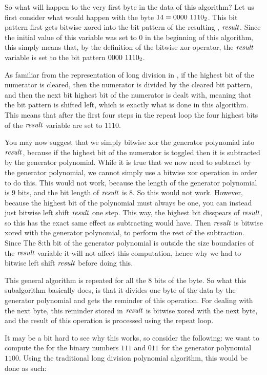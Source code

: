 So what will happen to the very first byte in the data of this
algorithm? Let us first consider what would happen with the byte $14 =
\mbox{\ensuremath{0000\ 1110_2}}$. This bit pattern first gets bitwise xored into the
bit pattern of the resulting \crc, $\mathit{result}$. Since the initial
value of this variable was set to $0$ in the beginning of this
algorithm, this simply means that, by the definition of the bitwise
xor operator, the $\mathit{result}$ variable is set to the bit pattern
$\mbox{\ensuremath{0000\ 1110_2}}$.

As familiar from the representation of long division in \crc, if the
highest bit of the numerator is cleared, then the numerator is divided
by the cleared bit pattern, and then the next bit highest bit of the
numerator is dealt with, meaning that the bit pattern is shifted left,
which is exactly what is done in this algorithm. This means that after
the first four steps in the repeat loop the four highest bits of the
$\mathit{result}$ variable are set to $1110$.

You may now suggest that we simply bitwise xor the generator
polynomial into $\mathit{result}$, because if the highest bit of the numerator
is toggled then it is subtracted by the generator polynomial. While it
is true that we now need to subtract by the generator polynomial, we
cannot simply use a bitwise xor operation in order to do this. This
would not work, because the length of the generator polynomial is $9$
bits, and the bit length of $\mathit{result}$ is $8$. So this would not
work. However, because the highest bit of the polynomial must always
be one, you can instead just bitwise left shift $\mathit{result}$ one
step. This way, the highest bit disspears of $\mathit{result}$, so this has the
exact same effect as subtracting would have. Then $\mathit{result}$ is bitwise
xored with the generator polynomial, to perform the rest of the
subtraction. Since The $8$:th bit of the generator polynomial is
outside the size boundaries of the $\mathit{result}$ variable it will not
affect this computation, hence why we had to bitwise left shift
$\mathit{result}$ before doing this.

This general algorithm is repeated for all the 8 bits of the byte. So
what this subalgorithm basically does, is that it divides one byte of
the data by the generator polynomial and gets the reminder of this
operation. For dealing with the next byte, this reminder stored in
$\mathit{result}$ is bitwise xored with the next byte, and the result of
this operation is processed using the repeat loop.

It may be a bit hard to see why this works, so consider the following:
we want to compute the \crc for the binary numbers $111$ and $011$ for
the generator polynomial $1100$. Using the traditional long division
polynomial algorithm, this would be done as such:

